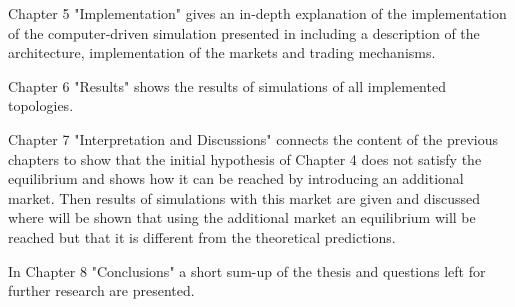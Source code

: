 \documentclass[Bachelorarbeit.tex]{subfiles}
\begin{document}
\bigskip

Chapter 5 "Implementation" gives an in-depth explanation of the implementation of the computer-driven simulation presented in \cite{Breuer2015} including a description of the architecture, implementation of the markets and trading mechanisms.

\bigskip

Chapter 6 "Results" shows the results of simulations of all implemented topologies.

\bigskip

Chapter 7 "Interpretation and Discussions" connects the content of the previous chapters to show that the initial hypothesis of Chapter 4 does not satisfy the equilibrium and shows how it can be reached by introducing an additional market. Then results of simulations with this market are given and discussed where will be shown that using the additional market an equilibrium will be reached but that it is different from the theoretical predictions.

\bigskip

In Chapter 8 "Conclusions" a short sum-up of the thesis and questions left for further research are presented.
\end{document}
